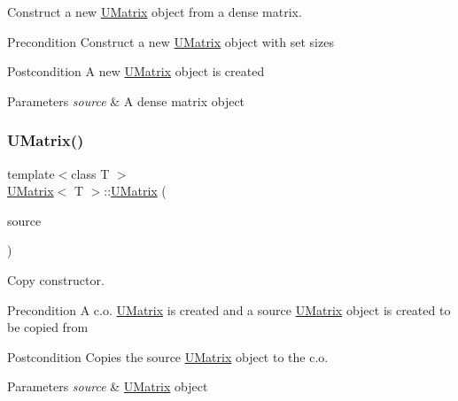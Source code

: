 Construct a new \mbox{\hyperlink{class_u_matrix}{U\+Matrix}} object from a dense matrix. 

\begin{DoxyPrecond}{Precondition}
Construct a new \mbox{\hyperlink{class_u_matrix}{U\+Matrix}} object with set sizes 
\end{DoxyPrecond}
\begin{DoxyPostcond}{Postcondition}
A new \mbox{\hyperlink{class_u_matrix}{U\+Matrix}} object is created 
\end{DoxyPostcond}

\begin{DoxyParams}{Parameters}
{\em source} & A dense matrix object \\
\hline
\end{DoxyParams}
\mbox{\label{class_u_matrix_ab95abe504ff32df243d625b6b749077d}} 
\subsubsection{\texorpdfstring{UMatrix()}{UMatrix()}\hspace{0.1cm}{\footnotesize\ttfamily [4/5]}}
{\footnotesize\ttfamily template$<$class T $>$ \\
\mbox{\hyperlink{class_u_matrix}{U\+Matrix}}$<$ T $>$\+::\mbox{\hyperlink{class_u_matrix}{U\+Matrix}} (\begin{DoxyParamCaption}\item[{const \mbox{\hyperlink{class_u_matrix}{U\+Matrix}}$<$ T $>$ \&}]{source }\end{DoxyParamCaption})}



Copy constructor. 

\begin{DoxyPrecond}{Precondition}
A c.\+o. \mbox{\hyperlink{class_u_matrix}{U\+Matrix}} is created and a source \mbox{\hyperlink{class_u_matrix}{U\+Matrix}} object is created to be copied from 
\end{DoxyPrecond}
\begin{DoxyPostcond}{Postcondition}
Copies the source \mbox{\hyperlink{class_u_matrix}{U\+Matrix}} object to the c.\+o. 
\end{DoxyPostcond}

\begin{DoxyParams}{Parameters}
{\em source} & \mbox{\hyperlink{class_u_matrix}{U\+Matrix}} object \\
\hline
\end{DoxyParams}
\mbox{\label{class_u_matrix_ada29056d4baec18fcb9bc47dc49e8d53}} 
